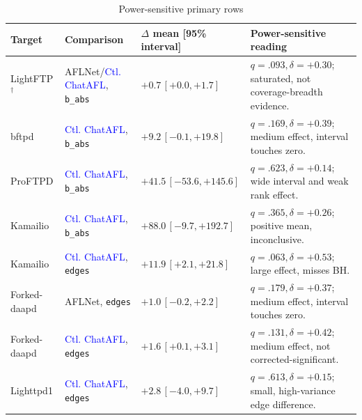 \documentclass[final,5p,times,number]{elsarticle}
\begin{document}
\begin{table}[!t]
\centering
\caption{Power-sensitive primary rows}
\label{tab:primary_power_sensitive}
{\scriptsize
\setlength{\tabcolsep}{3.0pt}
\renewcommand{\arraystretch}{0.90}
\begin{tabularx}{\textwidth}{>{\raggedright\arraybackslash}p{}
                            >{\raggedright\arraybackslash}p{}
                            >{\centering\arraybackslash}p{}
                            X}
\toprule
Target & Comparison & $\Delta$ mean [95\% interval] & Power-sensitive reading \\
\midrule
LightFTP$^\dagger$ & AFLNet/\textcolor{blue}{Ctl. ChatAFL}, \texttt{b\_abs} & $+0.7\,[+0.0,+1.7]$ & $q=.093,\delta=+0.30$; saturated, not coverage-breadth evidence. \\
bftpd & \textcolor{blue}{Ctl. ChatAFL}, \texttt{b\_abs} & $+9.2\,[-0.1,+19.8]$ & $q=.169,\delta=+0.39$; medium effect, interval touches zero. \\
ProFTPD & \textcolor{blue}{Ctl. ChatAFL}, \texttt{b\_abs} & $+41.5\,[-53.6,+145.6]$ & $q=.623,\delta=+0.14$; wide interval and weak rank effect. \\
Kamailio & \textcolor{blue}{Ctl. ChatAFL}, \texttt{b\_abs} & $+88.0\,[-9.7,+192.7]$ & $q=.365,\delta=+0.26$; positive mean, inconclusive. \\
Kamailio & \textcolor{blue}{Ctl. ChatAFL}, \texttt{edges} & $+11.9\,[+2.1,+21.8]$ & $q=.063,\delta=+0.53$; large effect, misses BH. \\
Forked-daapd & AFLNet, \texttt{edges} & $+1.0\,[-0.2,+2.2]$ & $q=.179,\delta=+0.37$; medium effect, interval touches zero. \\
Forked-daapd & \textcolor{blue}{Ctl. ChatAFL}, \texttt{edges} & $+1.6\,[+0.1,+3.1]$ & $q=.131,\delta=+0.42$; medium effect, not corrected-significant. \\
Lighttpd1 & \textcolor{blue}{Ctl. ChatAFL}, \texttt{edges} & $+2.8\,[-4.0,+9.7]$ & $q=.613,\delta=+0.15$; small, high-variance edge difference. \\
\bottomrule
\end{tabularx}
}
\end{table}
\end{document}
